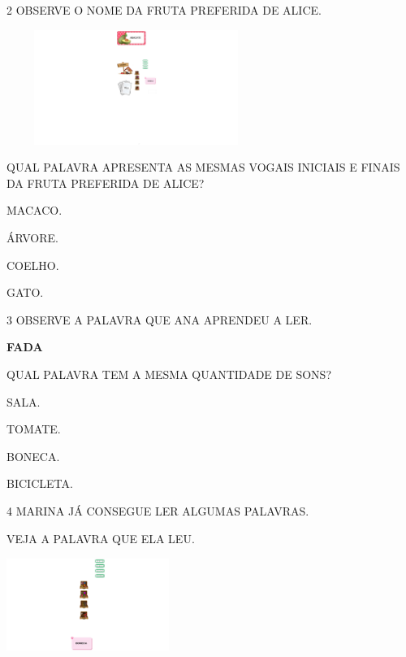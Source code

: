 \num{2} OBSERVE O NOME DA FRUTA PREFERIDA DE ALICE.

\includegraphics[width=3.32292in,height=1.46928in]{media/image212.png}


QUAL PALAVRA APRESENTA AS MESMAS VOGAIS INICIAIS E FINAIS DA FRUTA PREFERIDA DE ALICE?

\begin{escolha}
\item MACACO.

\item ÁRVORE.

\item COELHO.

\item GATO.
\end{escolha}


\num{3} OBSERVE A PALAVRA QUE ANA APRENDEU A LER.

\begin{mdframed}[linewidth=2pt,linecolor=azul!20,backgroundcolor=azul!20,roundcorner=2pt]
\textbf{FADA}
\end{mdframed}

QUAL PALAVRA TEM A MESMA QUANTIDADE DE SONS?

\begin{escolha}
\item SALA.

\item TOMATE.

\item BONECA.

\item BICICLETA.
\end{escolha}


\num{4} MARINA JÁ CONSEGUE LER ALGUMAS PALAVRAS.

VEJA A PALAVRA QUE ELA LEU.

\includegraphics[width=2.07917in,height=1.19306in]{media/image213.png}


